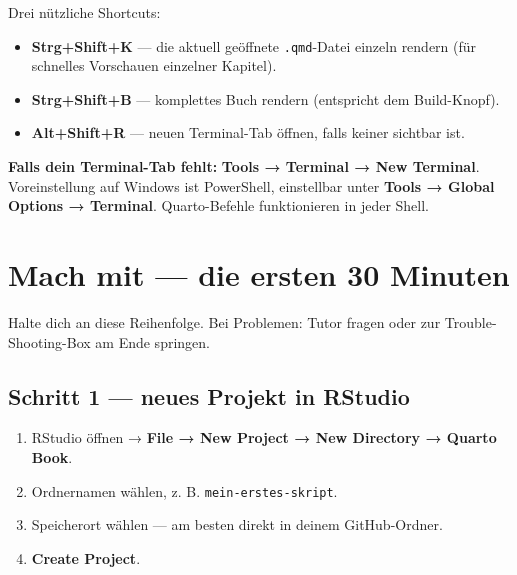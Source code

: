 \documentclass[
  ngerman,
  a4paper,
  DIV=11]{scrreprt}
\providecommand{\tightlist}{%
  \setlength{\itemsep}{0pt}\setlength{\parskip}{0pt}}
\begin{document}
Drei nützliche Shortcuts:

\begin{itemize}
\tightlist
\item
  \textbf{Strg+Shift+K} --- die aktuell geöffnete \texttt{.qmd}-Datei
  einzeln rendern (für schnelles Vorschauen einzelner Kapitel).
\item
  \textbf{Strg+Shift+B} --- komplettes Buch rendern (entspricht dem
  Build-Knopf).
\item
  \textbf{Alt+Shift+R} --- neuen Terminal-Tab öffnen, falls keiner
  sichtbar ist.
\end{itemize}

\begin{tcolorbox}[enhanced jigsaw, opacitybacktitle=0.6, leftrule=.75mm, title=\textcolor{quarto-callout-note-color}{\faInfo}\hspace{0.5em}{Hinweis}, colframe=quarto-callout-note-color-frame, arc=.35mm, toprule=.15mm, colbacktitle=quarto-callout-note-color!10!white, bottomrule=.15mm, colback=white, rightrule=.15mm, breakable, toptitle=1mm, bottomtitle=1mm, opacityback=0, titlerule=0mm, coltitle=black, left=2mm]

\textbf{Falls dein Terminal-Tab fehlt:} \textbf{Tools → Terminal → New
Terminal}. Voreinstellung auf Windows ist PowerShell, einstellbar unter
\textbf{Tools → Global Options → Terminal}. Quarto-Befehle funktionieren
in jeder Shell.

\end{tcolorbox}

\section{Mach mit --- die ersten 30
Minuten}\label{mach-mit-die-ersten-30-minuten}

Halte dich an diese Reihenfolge. Bei Problemen: Tutor fragen oder zur
Trouble-Shooting-Box am Ende springen.

\subsection{Schritt 1 --- neues Projekt in
RStudio}\label{schritt-1-neues-projekt-in-rstudio}

\begin{enumerate}
\def\labelenumi{\arabic{enumi}.}
\tightlist
\item
  RStudio öffnen → \textbf{File → New Project → New Directory → Quarto
  Book}.
\item
  Ordnernamen wählen, z. B. \texttt{mein-erstes-skript}.
\item
  Speicherort wählen --- am besten direkt in deinem GitHub-Ordner.
\item
  \textbf{Create Project}.
\end{enumerate}
\end{document}
